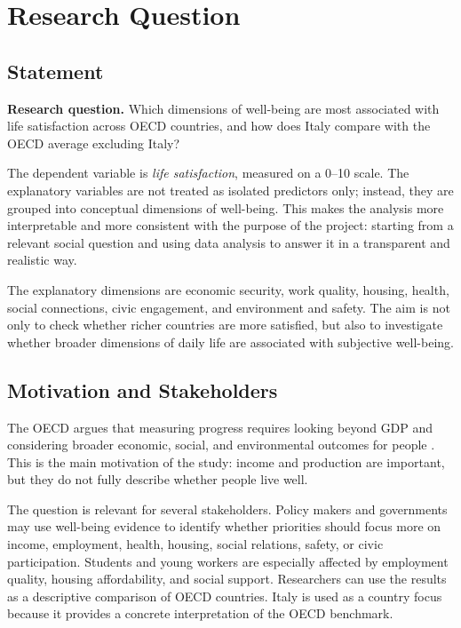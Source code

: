 \documentclass[11pt,a4paper]{article}
\begin{document}
\newpage
\tableofcontents
\newpage

\section{Research Question}

\subsection{Statement}

\begin{bluebox}
\textbf{Research question.} Which dimensions of well-being are most associated with life satisfaction across OECD countries, and how does Italy compare with the OECD average excluding Italy?
\end{bluebox}

The dependent variable is \textit{life satisfaction}, measured on a 0--10 scale. The explanatory variables are not treated as isolated predictors only; instead, they are grouped into conceptual dimensions of well-being. This makes the analysis more interpretable and more consistent with the purpose of the project: starting from a relevant social question and using data analysis to answer it in a transparent and realistic way.

The explanatory dimensions are economic security, work quality, housing, health, social connections, civic engagement, and environment and safety. The aim is not only to check whether richer countries are more satisfied, but also to investigate whether broader dimensions of daily life are associated with subjective well-being.

\subsection{Motivation and Stakeholders}

The OECD argues that measuring progress requires looking beyond GDP and considering broader economic, social, and environmental outcomes for people \cite{oecd_beyond_gdp}. This is the main motivation of the study: income and production are important, but they do not fully describe whether people live well.

The question is relevant for several stakeholders. Policy makers and governments may use well-being evidence to identify whether priorities should focus more on income, employment, health, housing, social relations, safety, or civic participation. Students and young workers are especially affected by employment quality, housing affordability, and social support. Researchers can use the results as a descriptive comparison of OECD countries. Italy is used as a country focus because it provides a concrete interpretation of the OECD benchmark.
\end{document}
